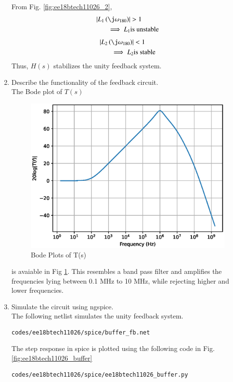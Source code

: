 \begin{enumerate}[label=\arabic*.,ref=\theenumi]
From Fig. \ref{fig:ee18btech11026_2},
\begin{align}
\abs{L_1\brak{\j\omega_{180}}} &> 1 
\\
\implies L_{1} &\text{is unstable}
\end{align}
\begin{align}
\abs{L_2\brak{\j\omega_{180}}} & < 1 
\\
\implies L_{2} &\text{is stable}
\end{align}
%
Thus, $H(s)$ stabilizes the unity feedback system.
\item Describe the functionality of the feedback circuit.
\\
\solution
The Bode plot of $T(s)$
\begin{figure}[!h]
    \centering
    \includegraphics[width=\columnwidth]{./figs/ee18btech11026/Bodeplot.eps}
    \caption{Bode Plots of T(s)}
    \label{fig:ee18btech11026_bode}
\end{figure}
is avaiable in  Fig \ref{fig:ee18btech11026_bode}. This resembles a band pass filter and amplifies the frequencies lying between 0.1 MHz to 10 MHz, while rejecting higher and lower frequencies.
%
\item Simulate the circuit using ngspice.
%
\\
\solution 
The following netlist simulates the unity feedback system. 
\begin{lstlisting}
codes/ee18btech11026/spice/buffer_fb.net
\end{lstlisting}
 The step response in spice is plotted using the following code in Fig. \ref{fig:ee18btech11026_buffer}
 \begin{lstlisting}
codes/ee18btech11026/spice/ee18btech11026_buffer.py
\end{lstlisting}


\end{enumerate}
